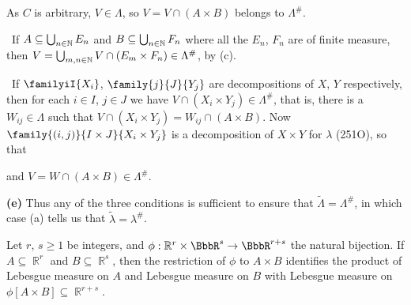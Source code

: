 {\noindent As $C$ is arbitrary, $V\in\Lambda$, so
$V=V\cap(A\times B)$ belongs to $\Lambda^{\#}$.

\medskip

\quad\grheadb\ If $A\subseteq\bigcup_{n\in\Bbb N}E_n$ and
$B\subseteq\bigcup_{n\in\Bbb N}F_n$ where all the $E_n$, $F_n$ are of
finite measure, then
$V=\bigcup_{m,n\in\Bbb N}V\cap(E_m\times F_n)\in\Lambda^{\#}$, by (c).

\medskip

\quad\grheadc\ If $\familyiI{X_i}$, $\family{j}{J}{Y_j}$ are
decompositions
of $X$, $Y$ respectively, then for each $i\in I$, $j\in J$ we have
$V\cap(X_i\times Y_j)\in\Lambda^{\#}$, that is, there is a
$W_{ij}\in\Lambda$ such that
$V\cap(X_i\times Y_j)=W_{ij}\cap(A\times B)$.
Now $\family{(i,j)}{I\times J}{X_i\times Y_j}$ is a decomposition of
$X\times Y$ for $\lambda$ (251O), so that


\noindent and $V=W\cap(A\times B)\in\Lambda^{\#}$.

\medskip

{\bf (e)} Thus any of the three conditions is sufficient to ensure that
$\tilde\Lambda=\Lambda^{\#}$, in which case (a) tells us that
$\tilde\lambda=\lambda^{\#}$.
}%

 Let $r$, $s\ge 1$ be integers, and
$\phi:\Bbb R^r\times\BbbR^s\to\BbbR^{r+s}$ the natural bijection.   If
$A\subseteq\BbbR^r$ and $B\subseteq\BbbR^s$, then the restriction of
$\phi$ to $A\times B$ identifies the product of Lebesgue measure on $A$
and Lebesgue measure on $B$ with Lebesgue measure on $\phi[A\times
B]\subseteq\BbbR^{r+s}$.



